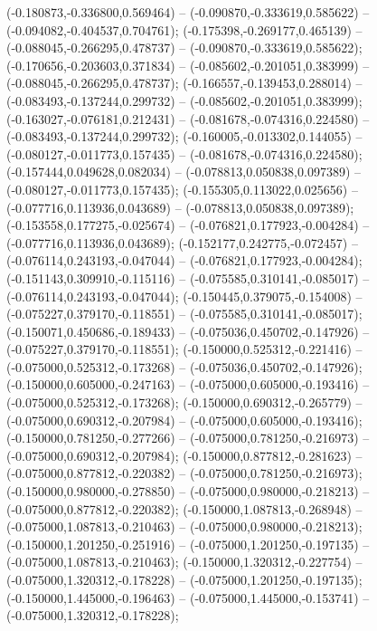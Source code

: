  (-0.180873,-0.336800,0.569464) -- (-0.090870,-0.333619,0.585622) -- (-0.094082,-0.404537,0.704761);
 (-0.175398,-0.269177,0.465139) -- (-0.088045,-0.266295,0.478737) -- (-0.090870,-0.333619,0.585622);
 (-0.170656,-0.203603,0.371834) -- (-0.085602,-0.201051,0.383999) -- (-0.088045,-0.266295,0.478737);
 (-0.166557,-0.139453,0.288014) -- (-0.083493,-0.137244,0.299732) -- (-0.085602,-0.201051,0.383999);
 (-0.163027,-0.076181,0.212431) -- (-0.081678,-0.074316,0.224580) -- (-0.083493,-0.137244,0.299732);
 (-0.160005,-0.013302,0.144055) -- (-0.080127,-0.011773,0.157435) -- (-0.081678,-0.074316,0.224580);
 (-0.157444,0.049628,0.082034) -- (-0.078813,0.050838,0.097389) -- (-0.080127,-0.011773,0.157435);
 (-0.155305,0.113022,0.025656) -- (-0.077716,0.113936,0.043689) -- (-0.078813,0.050838,0.097389);
 (-0.153558,0.177275,-0.025674) -- (-0.076821,0.177923,-0.004284) -- (-0.077716,0.113936,0.043689);
 (-0.152177,0.242775,-0.072457) -- (-0.076114,0.243193,-0.047044) -- (-0.076821,0.177923,-0.004284);
 (-0.151143,0.309910,-0.115116) -- (-0.075585,0.310141,-0.085017) -- (-0.076114,0.243193,-0.047044);
 (-0.150445,0.379075,-0.154008) -- (-0.075227,0.379170,-0.118551) -- (-0.075585,0.310141,-0.085017);
 (-0.150071,0.450686,-0.189433) -- (-0.075036,0.450702,-0.147926) -- (-0.075227,0.379170,-0.118551);
 (-0.150000,0.525312,-0.221416) -- (-0.075000,0.525312,-0.173268) -- (-0.075036,0.450702,-0.147926);
 (-0.150000,0.605000,-0.247163) -- (-0.075000,0.605000,-0.193416) -- (-0.075000,0.525312,-0.173268);
 (-0.150000,0.690312,-0.265779) -- (-0.075000,0.690312,-0.207984) -- (-0.075000,0.605000,-0.193416);
 (-0.150000,0.781250,-0.277266) -- (-0.075000,0.781250,-0.216973) -- (-0.075000,0.690312,-0.207984);
 (-0.150000,0.877812,-0.281623) -- (-0.075000,0.877812,-0.220382) -- (-0.075000,0.781250,-0.216973);
 (-0.150000,0.980000,-0.278850) -- (-0.075000,0.980000,-0.218213) -- (-0.075000,0.877812,-0.220382);
 (-0.150000,1.087813,-0.268948) -- (-0.075000,1.087813,-0.210463) -- (-0.075000,0.980000,-0.218213);
 (-0.150000,1.201250,-0.251916) -- (-0.075000,1.201250,-0.197135) -- (-0.075000,1.087813,-0.210463);
 (-0.150000,1.320312,-0.227754) -- (-0.075000,1.320312,-0.178228) -- (-0.075000,1.201250,-0.197135);
 (-0.150000,1.445000,-0.196463) -- (-0.075000,1.445000,-0.153741) -- (-0.075000,1.320312,-0.178228);
